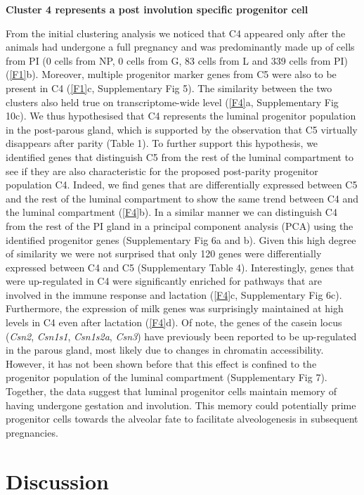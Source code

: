 \documentclass[titlepage, 12pt, oneside]{amsart}
\begin{document}
\textbf{Cluster 4 represents a post involution specific progenitor cell}

From the initial clustering analysis we noticed that C4 appeared only after the animals had undergone a full pregnancy and was predominantly made up of cells from PI (0 cells from NP, 0 cells from G, 83 cells from L and 339 cells from PI) (\autoref{F1}b).
Moreover, multiple progenitor marker genes from C5 were also to be present in C4 (\autoref{F1}c, Supplementary Fig 5).
The similarity between the two clusters also held true on transcriptome-wide level (\autoref{F4}a, Supplementary Fig 10c).
We thus hypothesised that C4 represents the luminal progenitor population in the post-parous gland, which is supported by the observation that C5 virtually disappears after parity (Table 1).
To further support this hypothesis, we identified genes that distinguish C5 from the rest of the luminal compartment to see if they are also characteristic for the proposed post-parity progenitor population C4.
Indeed, we find genes that are differentially expressed between C5 and the rest of the luminal compartment to show the same trend between C4 and the luminal compartment (\autoref{F4}b).
In a similar manner we can distinguish C4 from the rest of the PI gland in a principal component analysis (PCA) using the identified progenitor genes (Supplementary Fig 6a and b).
Given this high degree of similarity we were not surprised that only 120 genes were differentially expressed between C4 and C5 (Supplementary Table 4).
Interestingly, genes that were up-regulated in C4 were significantly enriched for pathways that are involved in the immune response and lactation (\autoref{F4}c, Supplementary Fig 6c).
Furthermore, the expression of milk genes was surprisingly maintained at high levels in C4 even after lactation (\autoref{F4}d).
Of note, the genes of the casein locus (\textit{Csn2}, \textit{Csn1s1}, \textit{Csn1s2a}, \textit{Csn3}) have previously been reported to be up-regulated in the parous gland, most likely due to changes in chromatin accessibility\autocite{Dos2015,Rijnkels2013}.
However, it has not been shown before that this effect is confined to the progenitor population of the luminal compartment (Supplementary Fig 7).
Together, the data suggest that luminal progenitor cells maintain memory of having undergone gestation and involution.
This memory could potentially prime progenitor cells towards the alveolar fate to facilitate alveologenesis in subsequent pregnancies.

\section{Discussion}
\end{document}
